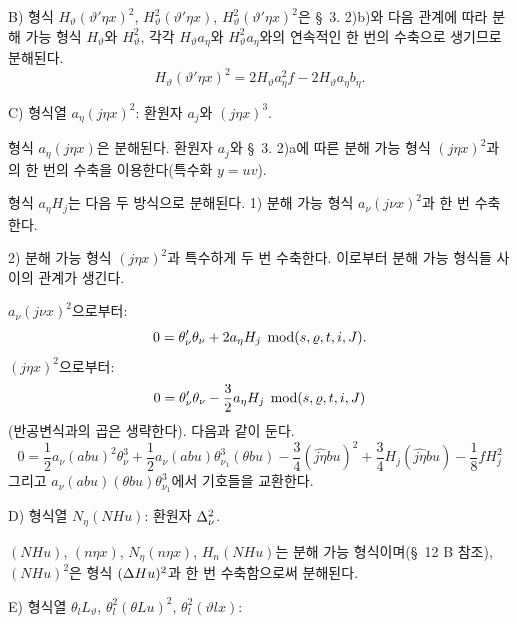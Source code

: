 \noindent B) 형식 $H_\vartheta(\vartheta'\eta x)^2$, $H_\vartheta^2(\vartheta'\eta x)$, $H_\vartheta^2(\vartheta'\eta x)^2$은 \S\ 3. 2)b)와 다음 관계에 따라 분해 가능 형식 $H_\vartheta$와 $H_\vartheta^2$, 각각 $H_\vartheta a_\eta$와 $H_\vartheta^2a_\eta$와의 연속적인 한 번의 수축으로 생기므로 분해된다.
\[
H_\vartheta(\vartheta'\eta x)^2=2H_\vartheta a_\eta^2f-2H_\vartheta a_\eta b_\eta.
\]

\noindent C) 형식열 $a_\eta(j\eta x)^2$: 환원자 $a_j$와 $(j\eta x)^3$.

형식 $a_\eta(j\eta x)$은 분해된다. 환원자 $a_j$와 \S\ 3. 2)a에 따른 분해 가능 형식 $(j\eta x)^2$과의 한 번의 수축을 이용한다(특수화 $y=uv$).

형식 $a_\eta H_j$는 다음 두 방식으로 분해된다. 1) 분해 가능 형식 $a_\nu(j\nu x)^2$과 한 번 수축한다.

2) 분해 가능 형식 $(j\eta x)^2$과 특수하게 두 번 수축한다. 이로부터 분해 가능 형식들 사이의 관계가 생긴다.

$a_\nu(j\nu x)^2$으로부터:
\[
0=\theta_\nu'\theta_\nu+2a_\eta H_j\;\operatorname{mod} (s,\varrho,t,i,J).
\]
$(j\eta x)^2$으로부터:
\[
0=\theta_\nu'\theta_\nu-\frac32a_\eta H_j\;\operatorname{mod} (s,\varrho,t,i,J)
\]
(반공변식과의 곱은 생략한다). 다음과 같이 둔다.
\[
0=\frac12a_\nu(abu)^2\theta_\nu^3
+\frac12a_\nu(abu)\theta_{\nu_1}^3(\theta bu)
-\frac34(\widehat{j\eta}bu)^2+\frac34H_j(\widehat{j\eta}bu)
-\frac18fH_j^2
\]
그리고 $a_\nu(abu)(\theta bu)\theta_{\nu_1}^3$에서 기호들을 교환한다.

\noindent D) 형식열 $N_\eta(NHu)$: 환원자 $\Delta_\nu^2$.

$(NHu)$, $(n\eta x)$, $N_\eta(n\eta x)$, $H_n(NHu)$는 분해 가능 형식이며(\S\ 12 B 참조), $(NHu)^2$은 형식 $(\Delta Hu)^2$과 한 번 수축함으로써 분해된다.

\noindent E) 형식열 $\theta_lL_\vartheta$, $\theta_l^2(\theta Lu)^2$, $\theta_l^2(\vartheta lx)$:

